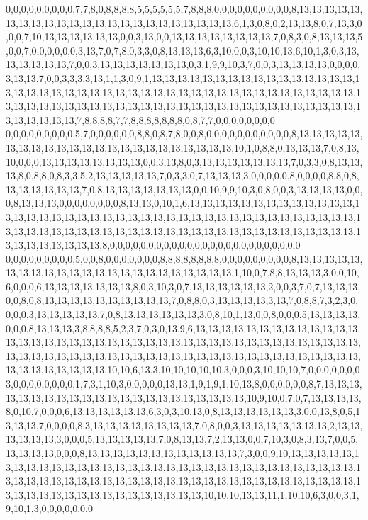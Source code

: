 0,0,0,0,0,0,0,0,0,7,7,8,0,8,8,8,8,5,5,5,5,5,5,7,8,8,8,0,0,0,0,0,0,0,0,0,0,8,13,13,13,13,13,13,13,13,13,13,13,13,13,13,13,13,13,13,13,13,13,13,13,6,1,3,0,8,0,2,13,13,8,0,7,13,3,0,0,0,7,10,13,13,13,13,13,13,0,0,3,13,0,0,13,13,13,13,13,13,13,13,7,0,8,3,0,8,13,13,13,5,0,0,7,0,0,0,0,0,0,3,13,7,0,7,8,0,3,3,0,8,13,13,13,6,3,10,0,0,3,10,10,13,6,10,1,3,0,3,13,13,13,13,13,13,7,0,0,3,13,13,13,13,13,13,13,0,3,1,9,9,10,3,7,0,0,3,13,13,13,13,0,0,0,0,3,13,13,7,0,0,3,3,3,3,13,1,1,3,0,9,1,13,13,13,13,13,13,13,13,13,13,13,13,13,13,13,13,13,13,13,13,13,13,13,13,13,13,13,13,13,13,13,13,13,13,13,13,13,13,13,13,13,13,13,13,13,13,13,13,13,13,13,13,13,13,13,13,13,13,13,13,13,13,13,13,13,13,13,13,13,13,13,13,13,13,13,13,13,13,7,8,8,8,8,7,7,8,8,8,8,8,8,8,0,8,7,7,0,0,0,0,0,0,0,0
0,0,0,0,0,0,0,0,0,5,7,0,0,0,0,0,0,8,8,0,8,7,8,0,0,8,0,0,0,0,0,0,0,0,0,0,0,8,13,13,13,13,13,13,13,13,13,13,13,13,13,13,13,13,13,13,13,13,13,13,13,10,1,0,8,8,0,13,13,13,7,0,8,13,10,0,0,0,13,13,13,13,13,13,13,13,0,0,3,13,8,0,3,13,13,13,13,13,13,13,7,0,3,3,0,8,13,13,13,8,0,8,8,0,8,3,3,5,2,13,13,13,13,13,7,0,3,3,0,7,13,13,13,3,0,0,0,0,0,8,0,0,0,0,8,8,0,8,13,13,13,13,13,13,7,0,8,13,13,13,13,13,13,13,0,0,10,9,9,10,3,0,8,0,0,3,13,13,13,13,0,0,0,8,13,13,13,0,0,0,0,0,0,0,0,8,13,13,0,10,1,6,13,13,13,13,13,13,13,13,13,13,13,13,13,13,13,13,13,13,13,13,13,13,13,13,13,13,13,13,13,13,13,13,13,13,13,13,13,13,13,13,13,13,13,13,13,13,13,13,13,13,13,13,13,13,13,13,13,13,13,13,13,13,13,13,13,13,13,13,13,13,13,13,13,13,13,13,13,8,0,0,0,0,0,0,0,0,0,0,0,0,0,0,0,0,0,0,0,0,0,0,0,0,0
0,0,0,0,0,0,0,0,0,5,0,0,8,0,0,0,0,0,0,0,8,8,8,8,8,8,8,8,0,0,0,0,0,0,0,0,0,8,13,13,13,13,13,13,13,13,13,13,13,13,13,13,13,13,13,13,13,13,13,13,13,1,10,0,7,8,8,13,13,13,3,0,0,10,6,0,0,0,6,13,13,13,13,13,13,13,8,0,3,10,3,0,7,13,13,13,13,13,13,2,0,0,3,7,0,7,13,13,13,0,0,8,0,8,13,13,13,13,13,13,13,13,13,13,7,0,8,8,0,3,13,13,13,13,3,13,7,0,8,8,7,3,2,3,0,0,0,0,3,13,13,13,13,13,7,0,8,13,13,13,13,13,13,3,0,8,10,1,13,0,0,8,0,0,0,5,13,13,13,13,0,0,0,8,13,13,13,3,8,8,8,8,5,2,3,7,0,3,0,13,9,6,13,13,13,13,13,13,13,13,13,13,13,13,13,13,13,13,13,13,13,13,13,13,13,13,13,13,13,13,13,13,13,13,13,13,13,13,13,13,13,13,13,13,13,13,13,13,13,13,13,13,13,13,13,13,13,13,13,13,13,13,13,13,13,13,13,13,13,13,13,13,13,13,13,13,13,13,13,10,10,6,13,3,10,10,10,10,10,3,0,0,0,3,10,10,10,7,0,0,0,0,0,0,0
3,0,0,0,0,0,0,0,0,1,7,3,1,10,3,0,0,0,0,0,13,13,1,9,1,9,1,10,13,8,0,0,0,0,0,0,8,7,13,13,13,13,13,13,13,13,13,13,13,13,13,13,13,13,13,13,13,13,13,13,10,9,10,0,7,0,7,13,13,13,13,8,0,10,7,0,0,0,6,13,13,13,13,13,13,6,3,0,3,10,13,0,8,13,13,13,13,13,13,3,0,0,13,8,0,5,13,13,13,7,0,0,0,0,8,3,13,13,13,13,13,13,13,13,7,0,8,0,0,3,13,13,13,13,13,13,13,2,13,13,13,13,13,13,3,0,0,0,5,13,13,13,13,13,7,0,8,13,13,7,2,13,13,0,0,7,10,3,0,8,3,13,7,0,0,5,13,13,13,13,0,0,0,8,13,13,13,13,13,13,13,13,13,13,13,13,7,3,0,0,9,10,13,13,13,13,13,13,13,13,13,13,13,13,13,13,13,13,13,13,13,13,13,13,13,13,13,13,13,13,13,13,13,13,13,13,13,13,13,13,13,13,13,13,13,13,13,13,13,13,13,13,13,13,13,13,13,13,13,13,13,13,13,13,13,13,13,13,13,13,13,13,13,13,13,13,13,13,13,10,10,10,13,13,11,1,10,10,6,3,0,0,3,1,9,10,1,3,0,0,0,0,0,0,0
